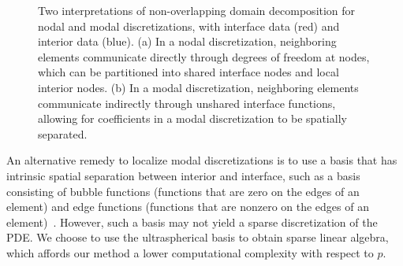 \begin{figure}[htb]
{{}}
  \caption{Two interpretations of non-overlapping domain decomposition for nodal and modal discretizations, with interface data (red) and interior data (blue). (a) In a nodal discretization, neighboring elements communicate directly through degrees of freedom at nodes, which can be partitioned into shared interface nodes and local interior nodes. (b) In a modal discretization, neighboring elements communicate indirectly through unshared interface functions, allowing for coefficients in a modal discretization to be spatially separated.}
  \label{fig:\chap:vals_vs_coeffs}
\end{figure}

An alternative remedy to localize modal discretizations is to use a basis that has intrinsic spatial separation between interior and interface, such as a basis consisting of bubble functions (functions that are zero on the edges of an element) and edge functions (functions that are nonzero on the edges of an element)~\cite{Sherwin_05_01}. However, such a basis may not yield a sparse discretization of the PDE. We choose to use the ultraspherical basis to obtain sparse linear algebra, which affords our method a lower computational complexity with respect to $p$.

